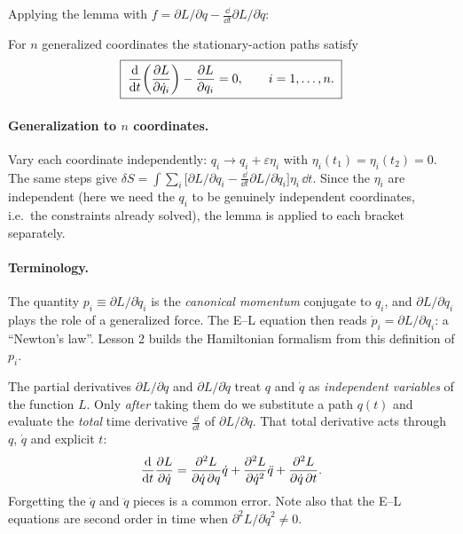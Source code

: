 \documentclass[11pt]{article}
\begin{document}
Applying the lemma with $f=\partial L/\partial q-\frac{\dd}{\dd t}\partial L/\partial\dot q$:

\begin{keyresult}
For $n$ generalized coordinates the stationary-action paths satisfy
\begin{equation}
  \boxed{\;\frac{\mathrm{d} }{\mathrm{d} t}\!\left(\frac{\partial L}{\partial \dot q_i}\right)-\frac{\partial L}{\partial q_i}=0,\qquad i=1,\dots,n.\;}
\end{equation}
\end{keyresult}

\paragraph{Generalization to $n$ coordinates.} Vary each coordinate independently: $q_i\to q_i+\varepsilon\eta_i$ with $\eta_i(t_1)=\eta_i(t_2)=0$. The same steps give $\delta S=\int\sum_i\bigl[\partial L/\partial q_i-\frac{\dd}{\dd t}\partial L/\partial\dot q_i\bigr]\eta_i\,\dd t$. Since the $\eta_i$ are independent (here we need the $q_i$ to be genuinely independent coordinates, i.e.\ the constraints already solved), the lemma is applied to each bracket separately.

\paragraph{Terminology.} The quantity $p_i\equiv\partial L/\partial\dot q_i$ is the \emph{canonical momentum} conjugate to $q_i$, and $\partial L/\partial q_i$ plays the role of a generalized force. The E--L equation then reads $\dot p_i=\partial L/\partial q_i$: a ``Newton's law''. Lesson 2 builds the Hamiltonian formalism from this definition of $p_i$.

\begin{pitfall}
The partial derivatives $\partial L/\partial q$ and $\partial L/\partial\dot q$ treat $q$ and $\dot q$ as \emph{independent variables} of the function $L$. Only \emph{after} taking them do we substitute a path $q(t)$ and evaluate the \emph{total} time derivative $\frac{\dd}{\dd t}$ of $\partial L/\partial\dot q$. That total derivative acts through $q$, $\dot q$ and explicit $t$:
\[
  \frac{\mathrm{d} }{\mathrm{d} t}\frac{\partial L}{\partial \dot q}=\frac{\partial^2L}{\partial\dot q\,\partial q}\dot q+\frac{\partial^2L}{\partial\dot q^2}\ddot q+\frac{\partial^2L}{\partial\dot q\,\partial t}.
\]
Forgetting the $\dot q$ and $\ddot q$ pieces is a common error. Note also that the E--L equations are second order in time when $\partial^2L/\partial\dot q^2\neq0$.
\end{pitfall}
\end{document}
